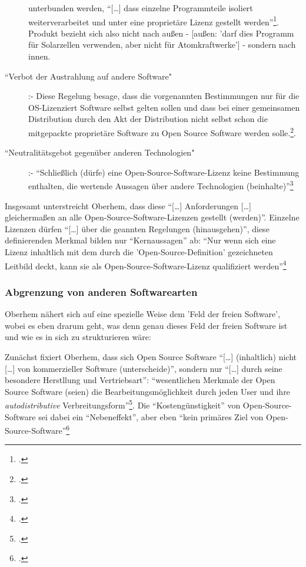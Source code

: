\documentclass[DIV=calc,BCOR=5mm,11pt,headings=small,oneside,abstract=true, toc=bib]{scrartcl}
\begin{document}
\begin{description}
  unterbunden werden, \enquote{[\ldots] dass einzelne Programmteile
  isoliert weiterverarbeitet und unter eine proprietäre Lizenz gestellt
  werden}\footcite[vgl.][16]{Oberhem2008a}. Produkt bezieht sich also
  nicht nach außen - [außen: 'darf dies Programm für Solarzellen verwenden, aber
  nicht für Atomkraftwerke'] - sondern nach innen.
  \item[``Verbot der Austrahlung auf andere Software"] :- Diese
  Regelung besage, dass die vorgenannten Bestimmungen nur für die OS-Lizenziert
  Software selbst gelten sollen und dass bei einer gemeinsamen Distribution
  durch den Akt der Distribution nicht selbst schon die mitgepackte proprietäre
  Software zu Open Source Software werden
  solle.\footcite[vgl.][16]{Oberhem2008a}.
  \item[``Neutralitätsgebot gegenüber anderen Technologien"] :-
  \enquote{Schließlich (dürfe) eine Open-Source-Software-Lizenz keine
  Bestimmung enthalten, die wertende Aussagen über andere Technologien
  (beinhalte)}\footcite[vgl.][17]{Oberhem2008a}
\end{description}

Insgesamt unterstreicht Oberhem, dass diese \enquote{[\ldots] Anforderungen
[\ldots] gleichermaßen an alle Open-Source-Software-Lizenzen gestellt
(werden)}. Einzelne Lizenzen dürfen \enquote{[\ldots] über die
geannten Regelungen (hinausgehen)}, diese definierenden Merkmal bilden nur
\enquote{Kernaussagen} ab: \enquote{Nur wenn sich eine Lizenz
inhaltlich mit dem durch die 'Open-Source-Definition' gezeichneten
Leitbild deckt, kann sie als Open-Source-Software-Lizenz qualifiziert
werden}\footcite[vgl.][17]{Oberhem2008a}

\subsubsection{Abgrenzung von anderen Softwarearten}

Oberhem nähert sich auf eine spezielle Weise dem 'Feld der freien Software',
wobei es eben drarum geht, was denn genau dieses Feld der freien Software ist
und wie es in sich zu strukturieren wäre:

Zunächst fixiert Oberhem, dass sich Open Source Software \enquote{[\ldots]
(inhaltlich) nicht [\ldots] von kommerzieller Software (unterscheide)},
sondern nur \enquote{[\ldots] durch seine besondere Herstllung und
Vertriebsart}: \enquote{wesentlichen Merkmale der Open Source Software
(seien) die Bearbeitungsmöglichkeit durch jeden User und ihre
\textit{autodistributive} Verbreitungsform}\footcite[vgl.][8 herv.
KR.]{Oberhem2008a}. Die \enquote{Kostengünstigkeit} von Open-Source-Software
sei dabei ein \enquote{Nebeneffekt}, aber eben \enquote{kein primäres
Ziel von Open-Source-Software}\footcite[vgl.][8]{Oberhem2008a}
\end{document}

